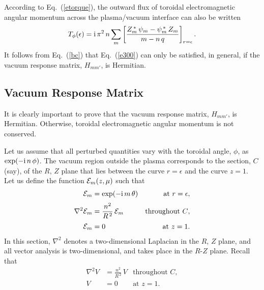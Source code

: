 \documentclass[12pt,prb,aps]{revtex4-1}
\begin{document}
According to Eq.~(\ref{etorque}), the outward flux of toroidal electromagnetic angular momentum across the plasma/vacuum interface can also be written
\begin{equation}
T_\phi(\epsilon) = {\rm i}\,\pi^2\,n\sum_m\left[\frac{Z_m^{\,\ast}\,\psi_m-\psi_m^{\,\ast}\,Z_m}{m-n\,q}\right]_{r=\epsilon}.
\end{equation}
It follows from Eq.~(\ref{bc}) that Eq.~(\ref{e300}) can only be satisfied, in general, if the vacuum
response matrix, $H_{mm'}$, is Hermitian. 

\subsection{Vacuum Response Matrix}\label{svacsoln1}
It is clearly important to prove that the vacuum response matrix, $H_{mm'}$,   is Hermitian. Otherwise, toroidal electromagnetic
angular momentum is not conserved. 

Let us assume that all perturbed quantities vary with the toroidal angle, $\phi$, as $\exp(-{\rm i}\,n\,\phi)$. 
The vacuum region outside the plasma corresponds to the section, $C$ (say), of the $R$, $Z$ plane that lies between
the curve $r=\epsilon$ and the curve $z=1$. 
Let us define the function ${\cal E}_m(z,\mu)$ such that
\begin{align}\label{e358}
{\cal E}_m&= \exp(-{\rm i}\,m\,\theta) &\mbox{at $r=\epsilon$},\\[0.5ex]
\nabla^2{\cal E}_m &= \frac{n^2}{R^{\,2}}\,{\cal E}_m &\mbox{throughout $C$},\label{e359}\\[0.5ex]
{\cal E}_m &= 0& \mbox{at $z=1$}.\label{e360}
\end{align}
In this section, $\nabla^2$  denotes a two-dimensional Laplacian in the $R$, $Z$ plane, and all vector analysis is two-dimensional, and takes place in the $R$-$Z$ plane. 
Recall that
\begin{align}
\nabla^2 V &= \frac{n^2}{R^{\,2}}\,V &\mbox{throughout $C$},\label{e361}\\[0.5ex]
V&= 0& \mbox{at $z=1$}.\label{e362}
\end{align}
\end{document}
